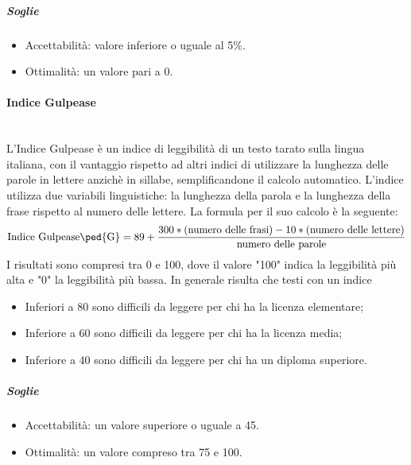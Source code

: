 \subparagraph{Soglie}
\begin{itemize}
\item Accettabilità: valore inferiore o uguale al 5\%.
\item Ottimalità: un valore pari a 0.
\end{itemize}

\paragraph{Indice Gulpease}
\label{AppB:IndiceGulpease}
	~\\L'{Indice Gulpease} è un indice di leggibilità di un testo tarato sulla lingua italiana, con il vantaggio rispetto ad altri indici di utilizzare la lunghezza delle parole in lettere anzichè in sillabe, semplificandone il calcolo automatico. L'indice utilizza due variabili linguistiche: la lunghezza della parola e la lunghezza della frase rispetto al numero delle lettere.
\newline La formula per il suo calcolo è la seguente:
\begin{displaymath}
\mbox{{Indice Gulpease}\ped{G}}= 89+\frac{300*\mbox{(numero delle frasi)}-10*\mbox{(numero delle lettere)}}{\mbox{numero delle parole}}
\end{displaymath}
I risultati sono compresi tra 0 e 100, dove il valore "100" indica la leggibilità più alta e "0" la leggibilità più bassa. In generale risulta che testi con un indice
\begin{itemize}
	\item Inferiori a 80 sono difficili da leggere per chi ha la licenza elementare;
	\item Inferiore a 60 sono difficili da leggere per chi ha la licenza media;
	\item Inferiore a 40 sono difficili da leggere per chi ha un diploma superiore.
\end{itemize}

\subparagraph{Soglie}
\begin{itemize}
\item Accettabilità: un valore superiore o uguale a 45.
\item Ottimalità: un valore compreso tra 75 e 100.
\end{itemize}

